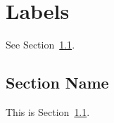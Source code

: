 \documentclass{book}
\begin{document}
\chapter{Labels}

See Section~\ref{sec:test}.

\section{Section Name}
\label{sec:test}
This is Section~\ref{sec:test}.
\end{document}
